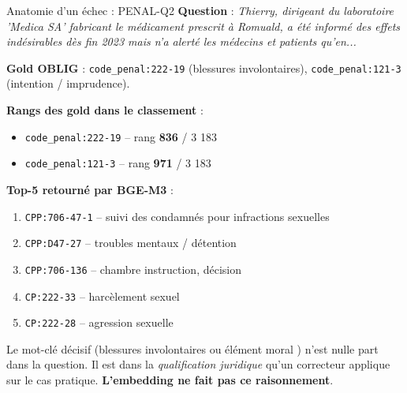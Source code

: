 \documentclass[aspectratio=169,10pt]{beamer}
\newcommand{\warnbox}[1]{%
  \begin{center}
  \colorbox{red!10}{\parbox{0.92\linewidth}{\centering #1}}
  \end{center}}
\begin{document}
\begin{frame}{Anatomie d'un échec : PENAL-Q2}
  \footnotesize
  \textbf{Question} : \emph{Thierry, dirigeant du laboratoire 'Medica SA' fabricant le
  médicament prescrit à Romuald, a été informé des effets indésirables dès fin 2023
  mais n'a alerté les médecins et patients qu'en...}

  \textbf{Gold OBLIG} : \texttt{code\_penal:222-19} (blessures involontaires),
  \texttt{code\_penal:121-3} (intention / imprudence).

  \vspace{0.4em}
  \textbf{Rangs des gold dans le classement} :
  \begin{itemize}\setlength\itemsep{0em}
    \item \texttt{code\_penal:222-19} -- rang \textcolor{warn}{\textbf{836}} / 3 183
    \item \texttt{code\_penal:121-3} -- rang \textcolor{warn}{\textbf{971}} / 3 183
  \end{itemize}

  \vspace{0.3em}
  \textbf{Top-5 retourné par BGE-M3} :
  \begin{enumerate}\setlength\itemsep{0em}
    \item \texttt{CPP:706-47-1} -- suivi des condamnés pour infractions sexuelles
    \item \texttt{CPP:D47-27} -- troubles mentaux / détention
    \item \texttt{CPP:706-136} -- chambre instruction, décision
    \item \texttt{CP:222-33} -- harcèlement sexuel
    \item \texttt{CP:222-28} -- agression sexuelle
  \end{enumerate}

  \vspace{0.3em}
  \warnbox{Le mot-clé décisif (\og blessures involontaires \fg{} ou \og élément moral \fg{})
  n'est nulle part dans la question. Il est dans la \emph{qualification juridique} qu'un
  correcteur applique sur le cas pratique. \textbf{L'embedding ne fait pas ce raisonnement}.}
\end{frame}
\end{document}
